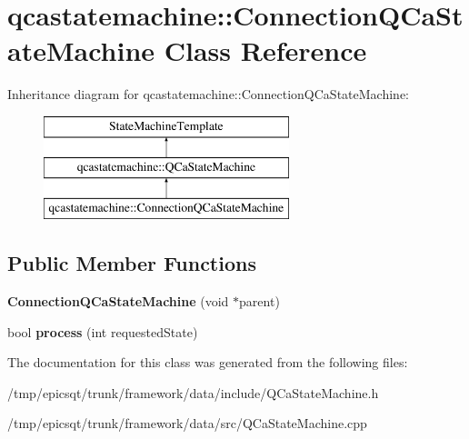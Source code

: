 \hypertarget{classqcastatemachine_1_1ConnectionQCaStateMachine}{
\section{qcastatemachine::ConnectionQCaStateMachine Class Reference}
\label{classqcastatemachine_1_1ConnectionQCaStateMachine}
}
Inheritance diagram for qcastatemachine::ConnectionQCaStateMachine:\begin{figure}[H]
\begin{center}
\leavevmode
\includegraphics[height=3.000000cm]{classqcastatemachine_1_1ConnectionQCaStateMachine}
\end{center}
\end{figure}
\subsection*{Public Member Functions}
\begin{DoxyCompactItemize}
\item 
\hypertarget{classqcastatemachine_1_1ConnectionQCaStateMachine_a27c364551172947037fe5ccedc16d60a}{
{\bfseries ConnectionQCaStateMachine} (void $\ast$parent)}
\label{classqcastatemachine_1_1ConnectionQCaStateMachine_a27c364551172947037fe5ccedc16d60a}

\item 
\hypertarget{classqcastatemachine_1_1ConnectionQCaStateMachine_a551b85c4d4a43d58c45fe53764690a70}{
bool {\bfseries process} (int requestedState)}
\label{classqcastatemachine_1_1ConnectionQCaStateMachine_a551b85c4d4a43d58c45fe53764690a70}

\end{DoxyCompactItemize}


The documentation for this class was generated from the following files:\begin{DoxyCompactItemize}
\item 
/tmp/epicsqt/trunk/framework/data/include/QCaStateMachine.h\item 
/tmp/epicsqt/trunk/framework/data/src/QCaStateMachine.cpp\end{DoxyCompactItemize}
